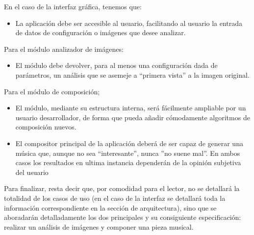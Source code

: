 En el caso de la interfaz gráfica, tenemos que:

\begin{itemize}
	\item La aplicación debe ser accesible al usuario, facilitando al usuario la entrada de datos de configuración o imágenes que desee analizar.

\end{itemize}

Para el módulo analizador de imágenes:

\begin{itemize}
	\item El módulo debe devolver, para al menos una configuración dada de parámetros, un análisis que se asemeje a ``primera vista'' a la imagen original.
\end{itemize}

Para el módulo de composición;
\begin{itemize}
	\item El módulo, mediante su estructura interna, será fácilmente ampliable por un usuario desarrollador, de forma que pueda añadir cómodamente algoritmos de composición nuevos.
	\item El compositor principal de la aplicación deberá de ser capaz de generar una música que, aunque no sea ``interesante'', nunca ''no suene mal''. En ambos casos los resultados en ultima instancia dependerán de la opinión subjetiva del usuario
\end{itemize}

Para finalizar, resta decir que, por comodidad para el lector, no se detallará la totalidad de los casos de uso (en el caso de la interfaz se detallará toda la información correspondiente en la sección de arquitectura), sino que se aboradarán detalladamente los dos principales y su consiguiente especificación: realizar un análisis de imágenes y componer una pieza musical.






























